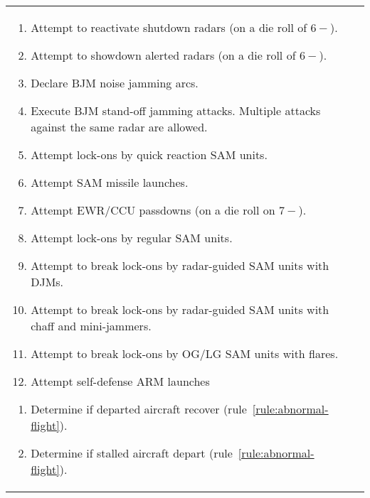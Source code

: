 \begin{twocolumntable}
\begin{tabularx}{1.0\linewidth}{L@{\hspace{\columnsep}}L}
{\begin{enumerate}
\begin{enumerate}[nosep]
    \item Attempt to reactivate shutdown radars (on a die roll of $6-$).
    \item Attempt to showdown alerted radars (on a die roll of $6-$).
    \item Declare BJM noise jamming arcs.
    \item Execute BJM stand-off jamming attacks. Multiple attacks against the same radar are allowed.
    \item Attempt lock-ons by quick reaction SAM units.
    \item Attempt SAM missile launches.
    \item Attempt EWR/CCU passdowns (on a die roll on $7-$).
    \item Attempt lock-ons by regular SAM units.
    \item Attempt to break lock-ons by radar-guided SAM units with DJMs.
    \item Attempt to break lock-ons by radar-guided SAM units with chaff and mini-jammers.
    \item Attempt to break lock-ons by OG/LG SAM units with flares.
    \item Attempt self-defense ARM launches
\end{enumerate}


\begin{enumerate}[nosep]
    \item Determine if departed aircraft recover (rule~\ref{rule:abnormal-flight}).
    \item Determine if stalled aircraft depart (rule~\ref{rule:abnormal-flight}).
\end{enumerate}



\end{enumerate}}
\end{tabularx}
\end{twocolumntable}
